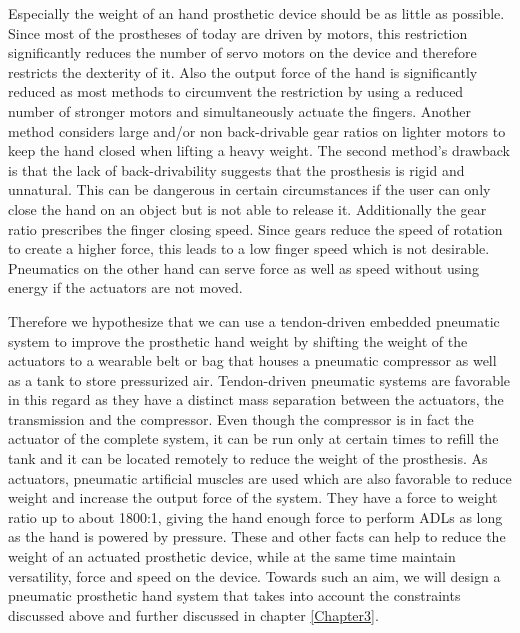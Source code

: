 \documentclass[main]{subfiles}
\begin{document}
Especially the weight of an hand prosthetic device should be as little as possible. Since most of the prostheses of today are driven by motors, this restriction significantly reduces the number of servo motors on the device and therefore restricts the dexterity of it. Also the output force of the hand is significantly reduced as most methods to circumvent the restriction by using a reduced number of stronger motors and simultaneously actuate the fingers. Another method considers large and/or non back-drivable gear ratios on lighter motors to keep the hand closed when lifting a heavy weight. The second method's drawback is that the lack of back-drivability suggests that the prosthesis is rigid and unnatural. This can be dangerous in certain circumstances if the user can only close the hand on an object but is not able to release it. Additionally the gear ratio prescribes the finger closing speed. Since gears reduce the speed of rotation to create a higher force, this leads to a low finger speed which is not desirable. Pneumatics on the other hand can serve force as well as speed without using energy if the actuators are not moved. 

Therefore we hypothesize that we can use a tendon-driven embedded pneumatic system to improve the prosthetic hand weight by shifting the weight of the actuators to a wearable belt or bag that houses a pneumatic compressor as well as a tank to store pressurized air. Tendon-driven pneumatic systems are favorable in this regard as they have a distinct mass separation between the actuators, the transmission and the compressor. Even though the compressor is in fact the actuator of the complete system, it can be run only at certain times to refill the tank and it can be located remotely to reduce the weight of the prosthesis. As actuators, pneumatic artificial muscles are used which are also favorable to reduce weight and increase the output force of the system. They have a force to weight ratio up to about 1800:1, giving the hand enough force to perform ADLs as long as the hand is powered by pressure. These and other facts can help to reduce the weight of an actuated prosthetic device, while at the same time maintain versatility, force and speed on the device. Towards such an aim, we will design a pneumatic prosthetic hand system that takes into account the constraints discussed above and further discussed in chapter \ref{Chapter3}.
\end{document}

